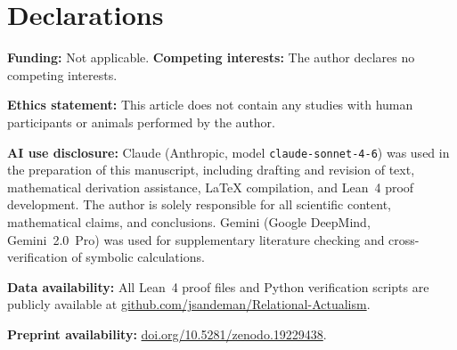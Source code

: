 \documentclass[11pt,a4paper]{article}
\begin{document}

\section*{Declarations}
\textbf{Funding:} Not applicable.\quad
\textbf{Competing interests:} The author declares no competing interests.

\textbf{Ethics statement:} This article does not contain any studies with human participants or animals performed by the author.

\textbf{AI use disclosure:} Claude (Anthropic, model \texttt{claude-sonnet-4-6}) was used in the preparation of this manuscript, including drafting and revision of text, mathematical derivation assistance, \LaTeX{} compilation, and Lean~4 proof development. The author is solely responsible for all scientific content, mathematical claims, and conclusions. Gemini (Google DeepMind, Gemini~2.0~Pro) was used for supplementary literature checking and cross-verification of symbolic calculations.

\textbf{Data availability:} All Lean~4 proof files and Python verification scripts are publicly available at \href{https://github.com/jsandeman/Relational-Actualism}{github.com/jsandeman/Relational-Actualism}.

\textbf{Preprint availability:} \href{https://doi.org/10.5281/zenodo.19229438}{doi.org/10.5281/zenodo.19229438}.


\end{document}
